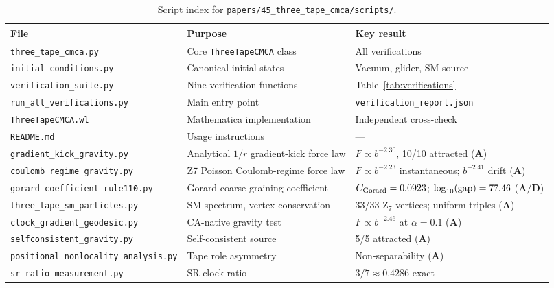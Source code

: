 \documentclass[11pt]{article}
\theoremstyle{remark}
\newcommand{\CatA}{\textbf{A}}
\newcommand{\CatAD}{\textbf{A/D}}
\begin{document}
\begin{appendices}
\begin{table}[H]
\centering\footnotesize
\begin{tabular}{P{4.2cm}P{4.6cm}P{4.6cm}}
\toprule
File & Purpose & Key result \\
\midrule
\texttt{three\_tape\_cmca.py} & Core \texttt{ThreeTapeCMCA} class & All verifications \\
\texttt{initial\_conditions.py} & Canonical initial states & Vacuum, glider, SM source \\
\texttt{verification\_suite.py} & Nine verification functions & Table~\ref{tab:verifications} \\
\texttt{run\_all\_\allowbreak verifications.py} & Main entry point &
  \texttt{verification\_\allowbreak report.json} \\
\texttt{ThreeTapeCMCA.wl} & Mathematica implementation & Independent cross-check \\
\texttt{README.md} & Usage instructions & --- \\
\texttt{gradient\_\allowbreak kick\_\allowbreak gravity.py} & Analytical $1/r$ gradient-kick force law &
  $F\propto b^{-2.30}$, 10/10 attracted ($\CatA$) \\
\texttt{coulomb\_\allowbreak regime\_\allowbreak gravity.py} & Z7 Poisson Coulomb-regime force law &
  $F\propto b^{-2.23}$ instantaneous; $b^{-2.41}$ drift ($\CatA$) \\
\texttt{gorard\_\allowbreak coefficient\_\allowbreak rule110.py} & Gorard coarse-graining coefficient &
  $C_{\rm Gorard} = 0.0923$; $\log_{10}({\rm gap}) = 77.46$ ($\CatAD$) \\
\texttt{three\_tape\_\allowbreak sm\_\allowbreak particles.py} & SM spectrum, vertex conservation &
  33/33 Z$_7$ vertices; uniform triples ($\CatA$) \\
\texttt{clock\_\allowbreak gradient\_\allowbreak geodesic.py} & CA-native gravity test &
  $F\propto b^{-2.46}$ at $\alpha{=}0.1$ ($\CatA$) \\
\texttt{selfconsistent\_gravity.py} & Self-consistent source & 5/5 attracted ($\CatA$) \\
\texttt{positional\_\allowbreak nonlocality\_\allowbreak analysis.py} & Tape role asymmetry &
  Non-separability ($\CatA$) \\
\texttt{sr\_ratio\_measurement.py} & SR clock ratio & $3/7 \approx 0.4286$ exact \\
\bottomrule
\end{tabular}
\caption{Script index for \texttt{papers/45\_three\_tape\_cmca/\allowbreak scripts/}.}
\end{table}


\end{appendices}
\end{document}
